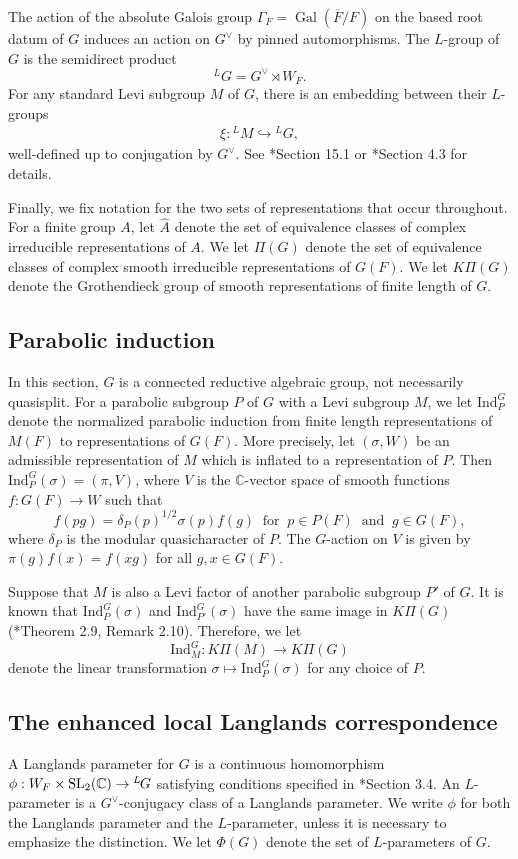 \documentclass[11pt,letterpaper]{amsart}
\newcommand{\rev}[1]{{\color{red}#1}}
\newcommand{\BC}{\mathbb{C}}
\newcommand{\SL}{\mathrm{SL}}
\newcommand{\dualgroup}[1]{{#1}^\vee}
\newcommand{\irrepdual}[1]{\widehat{#1}}
\newcommand{\Lgroup}[1]{{\hskip-2 pt \,^L\hskip-1pt{#1}}}
\newcommand{\Ind}{\mathrm{Ind}}
\newcommand{\CC}{\mathbb{C}}
\renewcommand{\1}{\mathbbm{1}}
\numberwithin{equation}{section}
\begin{document}
{ The action of the absolute Galois group
$
\Gamma_F=\operatorname{Gal}(\overline{F}/F)
$
on the based root datum of $G$ induces an action on $\dualgroup{G}$ by pinned automorphisms. The $L$-group of $G$ is the semidirect product
\[
{}^LG = \dualgroup{G}\rtimes W_F.
\]
For any standard Levi subgroup $M$ of $G$, there is an embedding between their $L$-groups
\begin{align}\label{eq Levi L embedding}
    \xi: {}^L M \hookrightarrow {}^L G,
\end{align} well-defined up to conjugation by $\dualgroup{G}$. See \cite{Bor79}*{Section 15.1} or \cite{Tai25}*{Section 4.3} for details.  



Finally, we fix notation for the two sets of representations that occur throughout. For a finite group $A$, let $\irrepdual{A}$ denote the set of equivalence classes of complex irreducible representations of $A$. 
We let $\Pi(G)$ denote the set of equivalence classes of complex smooth irreducible representations of $G(F)$. We let $K\Pi(G)$ denote the Grothendieck group of smooth representations of finite length of $G$.

\subsection{Parabolic induction}\rev{\label{subsec: parabolic induction}}
In this section, $G$ is a connected reductive algebraic group, not necessarily quasisplit.  For a parabolic subgroup $P$ of $G$ with a Levi subgroup $M$, we let $\Ind_P^G$ denote the normalized parabolic induction from finite length representations of $M(F)$ to representations of $G(F)$. More precisely, let $(\sigma,W)$ be an admissible representation of $M$ which is inflated to a representation of $P$. Then $\Ind_P^G(\sigma)=(\pi,V)$, where $V$ is the $\CC$-vector space of smooth functions $f:G(F)\to W$ such that 
\[f(pg)=\delta_P(p)^{1/2}\sigma(p)f(g) ~\text{ for }~ p\in P(F) ~\text{ and }~g\in G(F),\]
where $\delta_P$ is the modular quasicharacter of $P$. The $G$-action on $V$ is given by $\pi(g)f(x)=f(xg)$ for all $g,x\in G(F)$. 

Suppose that $M$ is also a Levi factor of another parabolic subgroup $P'$ of $G$. It is known that $\Ind_P^G(\sigma)$ and $\Ind_{P'}^G(\sigma)$ have the same image in $K\Pi(G)$ (\cite{BZ80}*{Theorem 2.9, Remark 2.10}). Therefore, we let 
\[ \Ind_M^G:K\Pi(M) \to K\Pi(G) \]
denote the linear transformation  $\sigma \mapsto \Ind_P^G(\sigma)$ for any choice of $P$.
\subsection{The enhanced local Langlands correspondence}\label{subsection: the enhanced local Langlands correspondence}
A Langlands parameter for $G$ is a continuous homomorphism $\phi: W_F \times \SL_2(\BC) \to \Lgroup{G}$ satisfying conditions specified in \cite{CFMMX22}*{Section 3.4}. An $L$-parameter is a $\dualgroup{G}$-conjugacy class of a Langlands parameter. We write $\phi$ for both the Langlands parameter and the $L$-parameter, unless it is necessary to emphasize the distinction. We let $\Phi(G)$ denote the set of $L$-parameters of $G$. 

}
\end{document}
